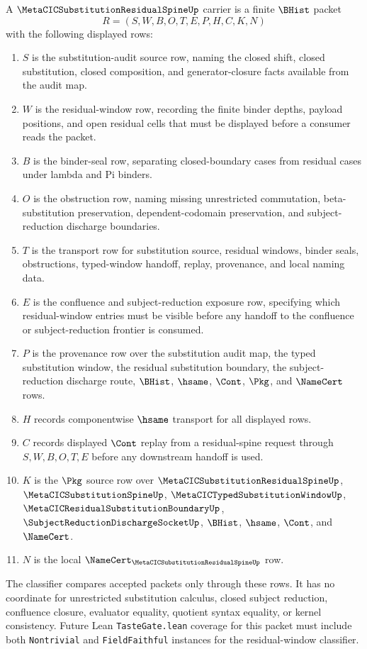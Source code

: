 \begin{definition}
\label{def:metacic-substitution-residual-spine-carrier}
A $\MetaCICSubstitutionResidualSpineUp$ carrier is a finite $\BHist$ packet
$$
R=(S,W,B,O,T,E,P,H,C,K,N)
$$
with the following displayed rows:
\begin{enumerate}
\item $S$ is the substitution-audit source row, naming the closed shift, closed substitution, closed composition, and generator-closure facts available from the audit map.
\item $W$ is the residual-window row, recording the finite binder depths, payload positions, and open residual cells that must be displayed before a consumer reads the packet.
\item $B$ is the binder-seal row, separating closed-boundary cases from residual cases under lambda and Pi binders.
\item $O$ is the obstruction row, naming missing unrestricted commutation, beta-substitution preservation, dependent-codomain preservation, and subject-reduction discharge boundaries.
\item $T$ is the transport row for substitution source, residual windows, binder seals, obstructions, typed-window handoff, replay, provenance, and local naming data.
\item $E$ is the confluence and subject-reduction exposure row, specifying which residual-window entries must be visible before any handoff to the confluence or subject-reduction frontier is consumed.
\item $P$ is the provenance row over the substitution audit map, the typed substitution window, the residual substitution boundary, the subject-reduction discharge route, $\BHist$, $\hsame$, $\Cont$, $\Pkg$, and $\NameCert$ rows.
\item $H$ records componentwise $\hsame$ transport for all displayed rows.
\item $C$ records displayed $\Cont$ replay from a residual-spine request through $S,W,B,O,T,E$ before any downstream handoff is used.
\item $K$ is the $\Pkg$ source row over $\MetaCICSubstitutionResidualSpineUp$, $\MetaCICSubstitutionSpineUp$, $\MetaCICTypedSubstitutionWindowUp$, $\MetaCICResidualSubstitutionBoundaryUp$, $\SubjectReductionDischargeSocketUp$, $\BHist$, $\hsame$, $\Cont$, and $\NameCert$.
\item $N$ is the local $\NameCert_{\MetaCICSubstitutionResidualSpineUp}$ row.
\end{enumerate}
The classifier compares accepted packets only through these rows. It has no coordinate for unrestricted substitution calculus, closed subject reduction, confluence closure, evaluator equality, quotient syntax equality, or kernel consistency. Future Lean \texttt{TasteGate.lean} coverage for this packet must include both \texttt{Nontrivial} and \texttt{FieldFaithful} instances for the residual-window classifier.
\end{definition}

